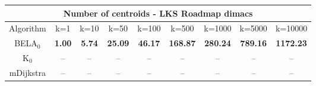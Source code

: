 \begin{tabular}{c|cccccccc}\toprule
\multicolumn{9}{c}{Number of centroids - LKS Roadmap dimacs}\\ \midrule
Algorithm & k=1 & k=10 & k=50 & k=100 & k=500 & k=1000 & k=5000 & k=10000 \\ \midrule
BELA$_0$ & \textbf{1.00} & \textbf{5.74} & \textbf{25.09} & \textbf{46.17} & \textbf{168.87} & \textbf{280.24} & \textbf{789.16} & \textbf{1172.23} \\
K$_0$ & -- & -- & -- & -- & -- & -- & -- & -- \\
mDijkstra & -- & -- & -- & -- & -- & -- & -- & -- \\ \bottomrule 
\end{tabular}

